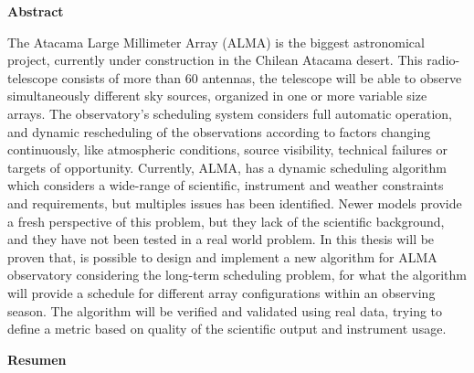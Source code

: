 \thispagestyle{empty}
\vspace*{\fill}

\begin{center}
\begin{LARGE}\textbf{Abstract}\end{LARGE}
\end{center}

The Atacama Large Millimeter Array (ALMA) is the biggest astronomical project, currently under
construction in the Chilean Atacama desert. This radio-telescope consists of more than 60
antennas, the telescope will be able to observe simultaneously different sky sources, organized in one or more
variable size arrays. The observatory's scheduling system considers full automatic
operation, and dynamic rescheduling of the observations according to factors changing continuously, like atmospheric
conditions, source visibility, technical failures or targets of opportunity.
Currently, ALMA, has a dynamic scheduling algorithm which considers a wide-range of scientific,
instrument and weather constraints and requirements, but multiples issues has been
identified. Newer models provide a fresh perspective of this problem, but they lack of the
scientific background, and they have not been tested in a real world problem.
In this thesis will be proven that, is possible to design and implement a new algorithm for ALMA observatory 
considering the long-term scheduling problem, for what the algorithm will provide a schedule 
for different array configurations within an observing
season. The algorithm will be verified and validated using real data, trying to define a metric based on quality
of the scientific output and instrument usage.

\vspace{0.5cm}

\begin{center}
\begin{LARGE}\textbf{Resumen}\end{LARGE}
\end{center}

